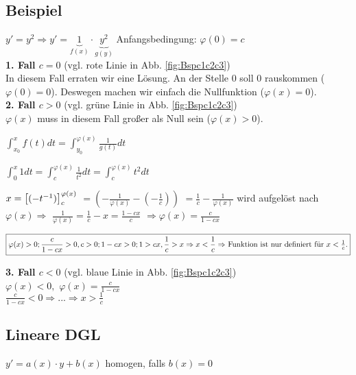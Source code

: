 \subsection{Beispiel}
$ y' = y^2 \Rightarrow y' = \underbrace{1}_{f(x)} \cdot \underbrace{y^2}_{g(y)}$ Anfangsbedingung: $ \varphi(0) = c$\\

\textbf{1. Fall \underline{$c=0$}} (vgl. rote Linie in Abb. \ref{fig:Bspc1c2c3})\\
In diesem Fall erraten wir eine Lösung. An der Stelle 0 soll 0 rauskommen ($\varphi(0)=0$). Deswegen machen wir einfach die Nullfunktion ($\varphi(x)=0$).\\

\textbf{2. Fall \underline{$c>0$}} (vgl. grüne Linie in Abb. \ref{fig:Bspc1c2c3})\\
$ \varphi(x)$ muss in diesem Fall großer als Null sein ($\varphi(x) > 0$). 

$ \int_{x_0}^{x} f(t) dt = \int_{y_0}^{\varphi(x)} \frac{1}{g(t)} dt$

$\int_{0}^{x} 1 dt = \int_{c}^{\varphi(x)} \frac{1}{t^2} dt = \int_{c}^{\varphi(x)} t^2 dt$

$x= \left[ (-t^{-1}) \right] _c^{\varphi(x)}$
$=(-\frac{1}{\varphi(x)} - (-\frac{1}{c}) )$
$=\frac{1}{c} - \frac{1}{\varphi(x)}$ wird aufgelöst nach $\varphi(x) \Rightarrow$ 
$\frac{1}{\varphi(x)} = \frac{1}{c} - x = \frac{1-cx}{c} $
$\Rightarrow \varphi(x) = \frac{c}{1-cx}$

$\boxed{
\varphi(x) > 0; \\
\frac{c}{1-cx} > 0, c>0;\\
1-cx > 0;\\
1 > cx, \frac{1}{c} > x \Rightarrow x < \frac{1}{c} \Rightarrow $ Funktion ist nur definiert für $x < \frac{1}{c}.
} $

\textbf{3. Fall \underline{$c<0$}} (vgl. blaue Linie in Abb. \ref{fig:Bspc1c2c3})\\
$ \varphi(x) < 0, $
$ \varphi(x) = \frac{c}{1-cx}$\\

$ \boxed{\frac{c}{1-cx} < 0 \Rightarrow ... \Rightarrow x > \frac{1}{c}} $

\subsection{Lineare DGL}
$y' = a(x) \cdot y + b(x)$ homogen, falls $b(x) = 0$

